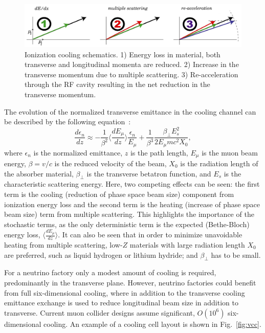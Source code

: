 \documentclass{jacow}
\begin{document}
\begin{figure}[htbf] 
\centering
\includegraphics[width=\columnwidth]{cooling_vector}
\caption{Ionization cooling schematics. 1) Energy loss in material, both transverse and longitudinal momenta are reduced. 2) Increase in the transverse momentum due to multiple scattering.  3) Re-acceleration through the RF cavity resulting in the net reduction in the transverse momentum.}
\label{fig:cooling_vector}
\end{figure}

The evolution of the normalized transverse emittance in the cooling channel can be 
described by the following equation~\cite{neuffer}:
\begin{equation}
\frac{d\epsilon_{n}}{dz} \approx -\frac{1}{\beta^{2}}
\langle\frac{dE_{\mu}}{dz}\rangle \frac{\epsilon_{n}}{E_{\mu}}+\frac{1}{\beta^{3}}\frac{\beta_{\perp}E_{s}^{2}}{2E_{\mu}mc^{2}X_{0}},
\label{eq:cooling}
\end{equation}
where $\epsilon_{n}$ is the normalized emittance, $z$ is the path length, $E_{\mu}$ is the muon beam energy, $\beta=v/c$ is the reduced velocity of the beam, $X_{0}$ is the radiation length of the absorber material, $\beta_{\perp}$ is the transverse betatron function, and $E_s$ is the characteristic scattering energy. Here, two competing effects can be seen: the first term is the cooling (reduction of phase space beam size) component from ionization energy loss and the second term is the heating (increase of phase space beam size) term from multiple scattering. This highlights the importance of the stochastic terms, as the only deterministic term is the expected (Bethe-Bloch) energy loss, $\langle\frac{dE_{\mu}}{dz}\rangle$. It can also be seen that in order to minimize unavoidable heating from multiple scattering, low-$Z$ materials with large radiation length $X_0$ are preferred, such as liquid hydrogen or lithium hydride; and $\beta_\perp$ has to be small.

For a neutrino factory only a modest amount of cooling is required, predominantly in the transverse plane. However, neutrino factories could benefit from full six-dimensional cooling, where in addition to the transverse cooling emittance exchange is used to reduce longitudinal beam size in addition to transverse. Current muon collider designs assume significant, $O(10^6)$ six-dimensional cooling. An example of a cooling cell layout is shown in Fig.~\ref{fig:vcc}.
\end{document}
